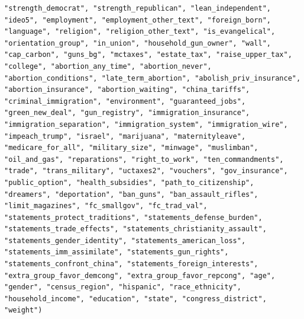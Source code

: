 \documentclass[
]{article}
\begin{document}
\begin{verbatim}
"strength_democrat", "strength_republican", "lean_independent", "ideo5", "employment", "employment_other_text", "foreign_born", "language", "religion", "religion_other_text", "is_evangelical", "orientation_group", "in_union", "household_gun_owner", "wall", "cap_carbon", "guns_bg", "mctaxes", "estate_tax", "raise_upper_tax", "college", "abortion_any_time", "abortion_never", "abortion_conditions", "late_term_abortion", "abolish_priv_insurance", "abortion_insurance", "abortion_waiting", "china_tariffs", "criminal_immigration", "environment", "guaranteed_jobs", "green_new_deal", "gun_registry", "immigration_insurance", "immigration_separation", "immigration_system", "immigration_wire", "impeach_trump", "israel", "marijuana", "maternityleave", "medicare_for_all", "military_size", "minwage", "muslimban", "oil_and_gas", "reparations", "right_to_work", "ten_commandments", "trade", "trans_military", "uctaxes2", "vouchers", "gov_insurance", "public_option", "health_subsidies", "path_to_citizenship", "dreamers", "deportation", "ban_guns", "ban_assault_rifles", "limit_magazines", "fc_smallgov", "fc_trad_val", "statements_protect_traditions", "statements_defense_burden", "statements_trade_effects", "statements_christianity_assault", "statements_gender_identity", "statements_american_loss", "statements_imm_assimilate", "statements_gun_rights", "statements_confront_china", "statements_foreign_interests", "extra_group_favor_demcong", "extra_group_favor_repcong", "age", "gender", "census_region", "hispanic", "race_ethnicity", "household_income", "education", "state", "congress_district", "weight")
\end{verbatim}
\end{document}
